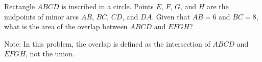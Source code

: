 Rectangle $ABCD$ is inscribed in a circle. Points $E$, $F$, $G$, and $H$ are the midpoints of minor arcs $AB$, $BC$, $CD$, and $DA$. Given that $AB=6$ and $BC=8$, what is the area of the overlap between $ABCD$ and $EFGH$?

Note: In this problem, the overlap is defined as the intersection of $ABCD$ and $EFGH$, not the union.
